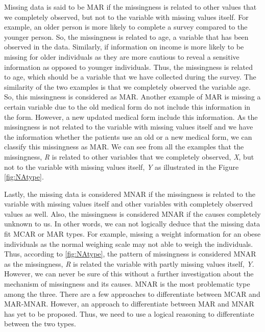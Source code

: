 \documentclass[
  10pt,
]{krantz}
\begin{document}
Missing data is said to be MAR if the missingness is related to other values that we completely observed, but not to the variable with missing values itself. For example, an older person is more likely to complete a survey compared to the younger person. So, the missingness is related to age, a variable that has been observed in the data. Similarly, if information on income is more likely to be missing for older individuals as they are more cautious to reveal a sensitive information as opposed to younger individuals. Thus, the missingness is related to age, which should be a variable that we have collected during the survey. The similarity of the two examples is that we completely observed the variable age. So, this missingness is considered as MAR. Another example of MAR is missing a certain variable due to the old medical form do not include this information in the form. However, a new updated medical form include this information. As the missingness is not related to the variable with missing values itself and we have the information whether the patients use an old or a new medical form, we can classify this missingness as MAR. We can see from all the examples that the missingness, \emph{R} is related to other variables that we completely observed, \emph{X}, but not to the variable with missing values itself, \emph{Y} as illustrated in the Figure \ref{fig:NAtype}.

Lastly, the missing data is considered MNAR if the missingness is related to the variable with missing values itself and other variables with completely observed values as well. Also, the missingness is considered MNAR if the causes completely unknown to us. In other words, we can not logically deduce that the missing data fit MCAR or MAR types. For example, missing a weight information for an obese individuals as the normal weighing scale may not able to weigh the individuals. Thus, according to \ref{fig:NAtype}, the pattern of missingness is considered MNAR as the missingness, \emph{R} is related the variable with partly missing values itself, \emph{Y}. However, we can never be sure of this without a further investigation about the mechanism of missingness and its causes. MNAR is the most problematic type among the three. There are a few approaches to differentiate between MCAR and MAR-MNAR. However, an approach to differentiate between MAR and MNAR has yet to be proposed. Thus, we need to use a logical reasoning to differentiate between the two types.
\end{document}
